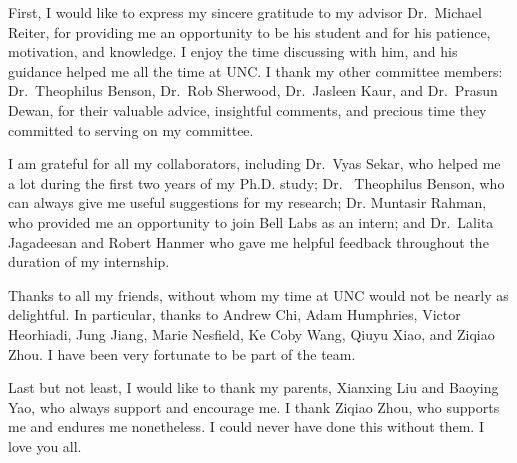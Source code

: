 First, I would like to express my sincere gratitude to my advisor Dr.~Michael Reiter, for providing me an opportunity to be his student and for his patience, motivation, and knowledge. I enjoy the time discussing with him, and his guidance helped me all the time at UNC. I thank my other committee members: Dr.~Theophilus Benson, Dr.~Rob Sherwood, Dr.~Jasleen Kaur, and Dr.~Prasun Dewan, for their valuable advice, insightful comments, and precious time they committed to serving on my committee.

I am grateful for all my collaborators, including Dr.~Vyas Sekar, who helped me a lot during the first two years of my Ph.D. study; Dr. ~Theophilus Benson, who can always give me useful suggestions for my research; Dr. Muntasir Rahman, who provided me an opportunity to join Bell Labs as an intern; and Dr.~Lalita Jagadeesan and Robert Hanmer who gave me helpful feedback throughout the duration of my internship.
 
Thanks to all my friends, without whom my time at UNC would not be nearly as delightful. In particular, thanks to Andrew Chi, Adam Humphries, Victor Heorhiadi, Jung Jiang, Marie Nesfield, Ke Coby Wang, Qiuyu Xiao, and Ziqiao Zhou. I have been very fortunate to be part of the team.


Last but not least, I would like to thank my parents, Xianxing Liu and Baoying Yao, who always support and encourage me. I thank Ziqiao Zhou, who supports me and endures me nonetheless. I could never have done this without them. I love you all.


